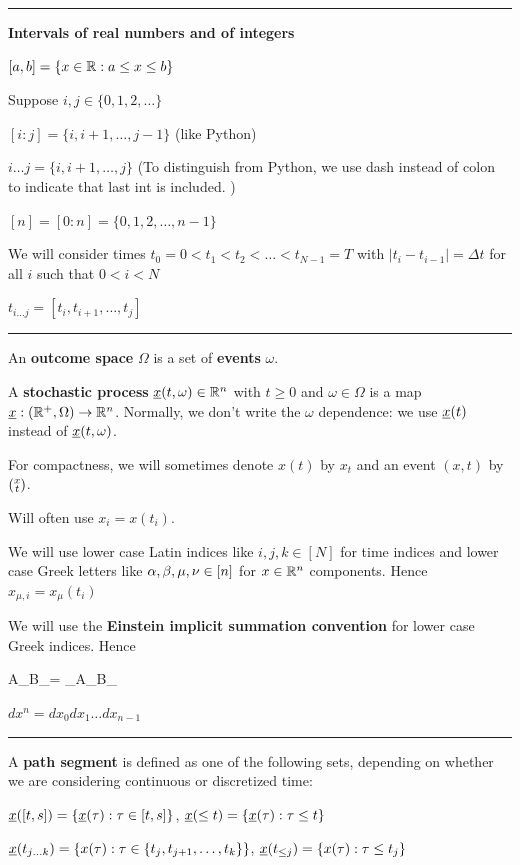 \hrule \noindent
{\bf Intervals of real numbers and of integers}

$[a, b]=\{ x\in { \mathbb{R}}: a\leq x \leq b\}$

Suppose $i, j\in \{0, 1,2, \ldots\}$

$[i:j] =\{i, i+1, \ldots, j-1\}$  (like Python)

$i \ldots j = \{i, i+1, \ldots, j\}$ (To distinguish from Python,
we use dash instead of colon
to indicate that last int is included.
)




$[n]=[0:n]=\{0, 1, 2, \ldots, n-1\}$


We will consider times $t_0=0<t_1<t_2<\ldots < t_{N-1}=T$
with $|t_{i}-t_{i-1}|=\Delta t$ for all $i$ such that $0<i<N$


$t_{i\ldots j} = [t_i, t_{i+1}, \ldots, t_j]$


\hrule{}

An {\bf outcome space} $\Omega$
is a set of {\bf events} $\omega$.

A {\bf stochastic process} $\rvx(t, \omega)\in\RR^n$ with $t\geq 0$ and $\omega\in\Omega$ is a map $\rvx:(\RR^+,\Omega) \rarrow \RR^n$. Normally, we don't write the $\omega$ dependence: we use $\rvx(t)$ instead of $\rvx(t, \omega)$.

For compactness, we will sometimes denote $x(t)$ by $x_t$ and an event $(x,t)$ by  $({\substack{x\\t}})$.

Will often use $x_i=x(t_i)$.

We will use lower case Latin indices like $i,j,k\in [N]$ for time indices
and lower case Greek letters like $\alpha, \beta, \mu, \nu\in[n]$  for $x\in{ \mathbb{R}}^n$ components.
Hence $x_{\mu, i}=x_\mu(t_i)$

We will use the {\bf Einstein implicit summation
convention} for lower case Greek indices.
Hence

\beq
A_\mu B_\mu = \sum_{\mu \in[n]}A_\mu B_\mu
\eeq


$dx^n = dx_0 dx_1 \ldots dx_{n-1}$
\hrule\noindent
A {\bf path segment} is defined as one of the following sets, depending on whether we are considering continuous or discretized time:

$\rvx([t,s])=\{  \rvx(\tau): \tau\in[t,s]\}$, \quad
$\rvx(\leq t)=\{  \rvx(\tau): \tau\leq t\}$



$\rvx(t_{j\ldots k}) =\{  x(\tau): \tau\in\{t_j, t_{j+1}, \ldots, t_k\}\}$,\quad
$\rvx(t_{\leq j}) =\{  x(\tau): \tau\leq t_j\}$

